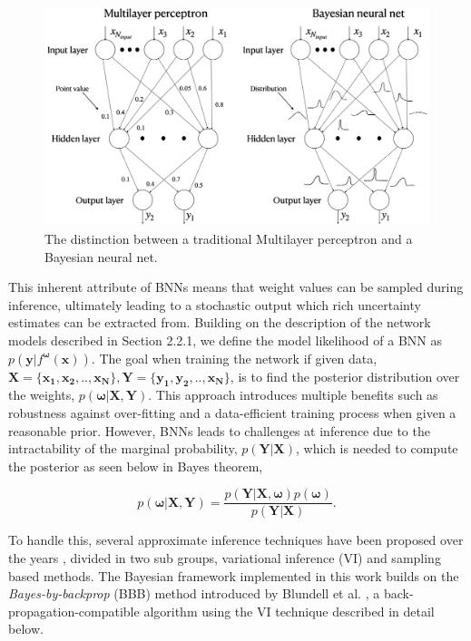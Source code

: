\documentclass[a4paper,12pt]{report}
\begin{document}
\begin{figure}[h]
\centering
\includegraphics[width=13cm]{figs/bnn.png}
\caption{The distinction between a traditional Multilayer perceptron and a Bayesian neural net.}
\label{bnn}
\end{figure}

This inherent attribute of BNNs means that weight values can be sampled during inference, ultimately leading to a stochastic output which rich uncertainty estimates can be extracted from. Building on the description of the network models described in Section 2.2.1, we define the model likelihood of a BNN as $p(\bm{y}|f^{\bm{\omega}}(\bm{x}))$. The goal when training the network if given data, $\bm{X} = \{\bm{x_1}, \bm{x_2},..,\bm{x_N}\}, \bm{Y} = \{\bm{y_1}, \bm{y_2},..,\bm{x_N}\}$, is to find the posterior distribution over the weights, $p(\bm{\omega}|\bm{X},\bm{Y})$. This approach introduces multiple benefits such as robustness against over-fitting and a data-efficient training process when given a reasonable prior. However, BNNs leads to challenges at inference due to the intractability of the marginal probability, $p(\bm{Y}|\bm{X})$, which is needed to compute the posterior as seen below in Bayes theorem,

\begin{equation}
\label{bayes}
p(\bm{\omega}|\bm{X},\bm{Y}) = \frac{p(\bm{Y}|\bm{X},\bm{\omega})p(\bm{\omega})}{p(\bm{Y}|\bm{X})}.
\end{equation}

To handle this, several approximate inference techniques have been proposed over the years \cite{graves2011practical, hernandez2016black, hastings1970monte}, divided in two sub groups, variational inference (VI)  and sampling based methods. The Bayesian framework implemented in this work builds on the \textit{Bayes-by-backprop} (BBB)  method introduced by Blundell et al. \cite{blundell2015weight}, a back-propagation-compatible algorithm using the VI technique described in detail below.
\end{document}
